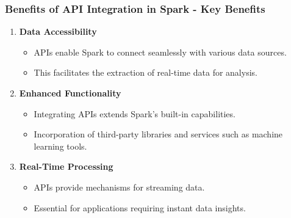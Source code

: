 \documentclass[aspectratio=169]{beamer}
\begin{document}
\begin{frame}[fragile]
    \frametitle{Benefits of API Integration in Spark - Key Benefits}
    \begin{enumerate}
        \item \textbf{Data Accessibility}
        \begin{itemize}
            \item APIs enable Spark to connect seamlessly with various data sources.
            \item This facilitates the extraction of real-time data for analysis.
        \end{itemize}
        \item \textbf{Enhanced Functionality}
        \begin{itemize}
            \item Integrating APIs extends Spark's built-in capabilities.
            \item Incorporation of third-party libraries and services such as machine learning tools.
        \end{itemize}
        \item \textbf{Real-Time Processing}
        \begin{itemize}
            \item APIs provide mechanisms for streaming data.
            \item Essential for applications requiring instant data insights.
        \end{itemize}
    \end{enumerate}
\end{frame}
\end{document}
